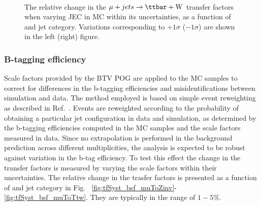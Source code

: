 \begin{figure}[]
  \centering
   ~~
  \\

  \caption{\label{fig:tfSyst_jec_muToTtw} The relative change in the
  $\mj \rightarrow \mathrm{\ttbar+W}$ transfer
  factors when varying JEC in MC within its uncertainties, as a function of \scalht and jet category. 
  Variations corresponding to $+1\sigma$ ($-1\sigma$) are shown in the left (right) figure. 
  }
\end{figure}





\subsubsection*{B-tagging efficiency}
\label{sec:tfSyst_btag}
Scale factors provided by the BTV POG are applied to the MC samples
to correct for differences in the b-tagging efficiencies and 
misidentifications between simulation and data. The method employed is
based on simple event reweighting as described in
Ref.~\cite{btagSFMethods}. Events are reweighted according to the
probability of obtaining a particular jet configuration in data
and simulation, as determined by the b-tagging efficiencies computed
in the MC samples and the scale factors measured in data.
Since no extrapolation is performed in the background prediction across different 
\nb  multiplicities, the analysis is expected to be robust against variation in the 
b-tag efficiency. 
To test this effect the change in the transfer factors is measured
by varying the scale factors within their uncertainties. 
The relative change in the trasfer factors is presented as a function of \scalht and jet category 
in Fig. ~\ref{fig:tfSyst_bsf_muToZinv}-\ref{fig:tfSyst_bsf_muToTtw}.
They are typically in the range of $1-5\%$.


